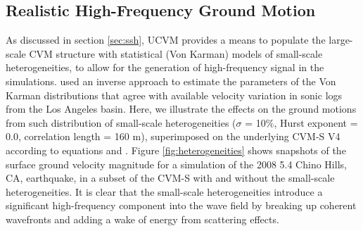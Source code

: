 
\subsection{Realistic High-Frequency Ground Motion}

As discussed in section \ref{sec:ssh}, UCVM provides a means to populate the large-scale CVM structure with statistical (Von Karman) models of small-scale heterogeneities, to allow for the generation of high-frequency signal in the simulations. \citet{Olsen_2014_USGS} used an inverse approach to estimate the parameters of the Von Karman distributions that agree with available velocity variation in sonic logs from the Los Angeles basin. Here, we illustrate the effects on the ground motions from such distribution of small-scale heterogeneities ($\sigma$ = 10\%, Hurst exponent = 0.0, correlation length = 160 m), superimposed on the underlying CVM-S V4 according to equations  and . Figure \ref{fig:heterogeneities} shows snapshots of the surface ground velocity magnitude for a simulation of the 2008  5.4 Chino Hills, CA, earthquake, in a subset of the CVM-S with and without the small-scale heterogeneities.  It is clear that the small-scale heterogeneities introduce a significant high-frequency component into the wave field by breaking up coherent wavefronts and adding a wake of energy from scattering effects.

